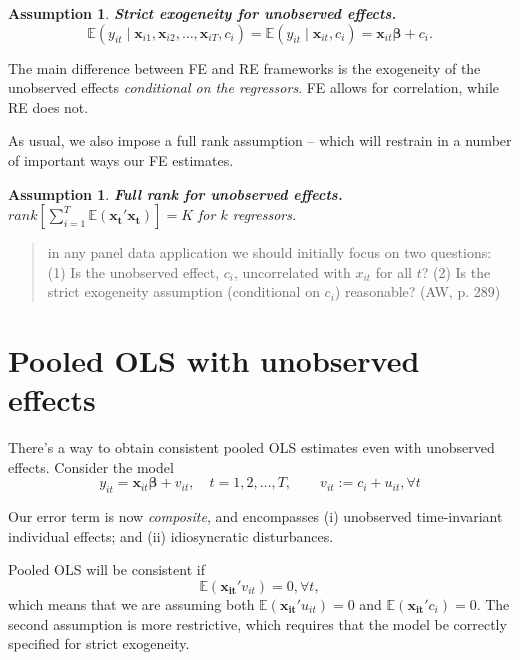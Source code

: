 \documentclass[11pt, a4paper]{report}
\theoremstyle{plain}
\newtheorem{assump}[thm]{Assumption}
\theoremstyle{plain}
\theoremstyle{remark}
\begin{document}
\begin{assump}
    \textbf{Strict exogeneity for unobserved effects.} \label{strict_exog_c} $$
    \mathbb{E}\left(y_{i t} \mid \mathbf{x}_{i 1}, \mathbf{x}_{i 2}, \ldots, \mathbf{x}_{i T}, c_{i}\right)=\mathbb{E}\left(y_{i t} \mid \mathbf{x}_{i t}, c_{i}\right)=\mathbf{x}_{i t} \boldsymbol{\beta}+c_{i}.
    $$
\end{assump}

The main difference between FE and RE frameworks is the exogeneity of the unobserved effects \textit{conditional on the regressors}. FE allows for correlation, while RE does not. 

As usual, we also impose a full rank assumption -- which will restrain in a number of important ways our FE estimates.

\begin{assump} \label{full_rank_c} \textbf{Full rank for unobserved effects.}
    $rank[\sum_{i=1}^T \mathbb{E}(\mathbf{x_t'x_t})] = K$ for $k$ regressors.
\end{assump}

\begin{quote}
     in any panel data application we should initially focus on two questions: (1) Is the unobserved effect, $c_i$, uncorrelated with $x_{it}$ for all $t$? (2) Is the strict exogeneity assumption (conditional on
$c_i$) reasonable? (AW, p. 289)
\end{quote}


\section{Pooled OLS with unobserved effects}

There's a way to obtain consistent pooled OLS estimates even with unobserved effects. Consider the model
\begin{equation}
    y_{i t}=\mathbf{x}_{i t} \boldsymbol{\beta}+v_{i t}, \quad t=1,2, \ldots, T, \hspace{2em} v_{it} := c_i + u_{it}, \forall t
\end{equation}

Our error term is now \textit{composite}, and encompasses (i) unobserved time-invariant individual effects; and (ii) idiosyncratic disturbances.

Pooled OLS will be consistent if
\begin{equation}
    \mathbb{E}(\mathbf{x_{it}'}v_{it}) = 0, \forall t,
\end{equation}
which means that we are assuming both $\mathbb{E}(\mathbf{x_{it}'}u_{it}) = 0$ and $\mathbb{E}(\mathbf{x_{it}'}c_{i}) = 0$. The second assumption is more restrictive, which requires that the model be correctly specified for strict exogeneity.
\end{document}
